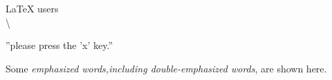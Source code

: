 \documentclass{proc}
\begin{document}
	\LaTeX{} users\\
	\textbackslash
	
	''please press the 'x' key.''
	
	Some \emph{emphasized words,including \emph{double-emphasized} words}, are shown here.
	
\end{document}
